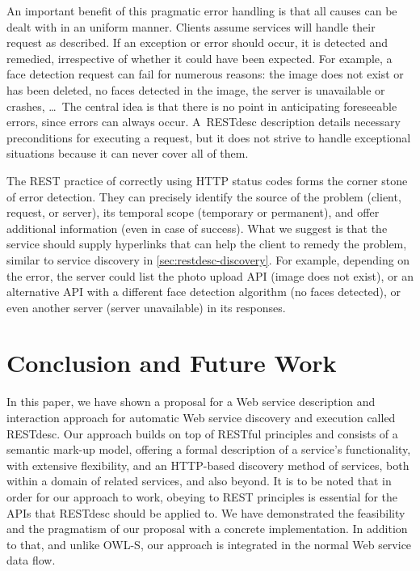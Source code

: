 \documentclass[smallextended]{svjour3}
\begin{document}
{An important benefit of this pragmatic error handling is that all causes can be dealt with in an uniform manner. Clients assume services will handle their request as described. If an exception or error should occur, it is detected and remedied, irrespective of whether it could have been expected. For example, a face detection request can fail for numerous reasons: the image does not exist or has been deleted, no faces detected in the image, the server is unavailable or crashes, \ldots\ The central idea is that there is no point in anticipating foreseeable errors, since errors can always occur. A~RESTdesc description details necessary preconditions for executing a request, but it does not strive to handle exceptional situations because it can never cover all of them.

The REST practice of correctly using HTTP status codes forms the corner stone of error detection. They can precisely identify the source of the problem (client, request, or server), its temporal scope (temporary or permanent), and offer additional information (even in case of success). What we suggest is that the service should supply hyperlinks that can help the client to remedy the problem, similar to service discovery in \autoref{sec:restdesc-discovery}. For example, depending on the error, the server could list the photo upload API (image does not exist), or an alternative API with a different face detection algorithm (no faces detected), or even another server (server unavailable) in its responses.

\section{Conclusion and Future Work} \label{sec:conclusion-and-future-work}
In this paper, we have shown a proposal for a Web service description and interaction approach for automatic Web service discovery and execution called RESTdesc. Our approach builds on top of RESTful principles and consists of a semantic mark-up model, offering a formal description of a service's functionality, with extensive flexibility, and an HTTP-based discovery method of services, both within a domain of related services, and also beyond. It is to be noted that in order for our approach to work, obeying to REST principles is essential for the APIs that RESTdesc should be applied to. We have demonstrated the feasibility and the pragmatism of our proposal with a concrete implementation. In addition to that, and unlike OWL-S, our approach is integrated in the normal Web service data flow.

}
\end{document}
